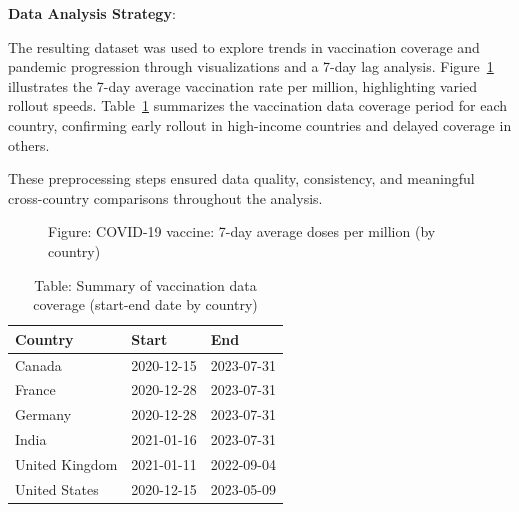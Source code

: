 \documentclass[
  11pt,
]{article}
\begin{document}
\textbf{Data Analysis Strategy}:

The resulting dataset was used to explore trends in vaccination coverage
and pandemic progression through visualizations and a 7-day lag
analysis. Figure~\ref{fig-vacc-trend} illustrates the 7-day average
vaccination rate per million, highlighting varied rollout speeds.
Table~\ref{tbl-vacc-summary} summarizes the vaccination data coverage
period for each country, confirming early rollout in high-income
countries and delayed coverage in others.

These preprocessing steps ensured data quality, consistency, and
meaningful cross-country comparisons throughout the analysis.

\begin{figure}


\caption{\label{fig-vacc-trend}Figure: COVID-19 vaccine: 7-day average
doses per million (by country)}

\end{figure}%

\begin{longtable}[]{@{}lll@{}}

\caption{\label{tbl-vacc-summary}Table: Summary of vaccination data
coverage (start-end date by country)}

\tabularnewline

\toprule\noalign{}
Country & Start & End \\
\midrule\noalign{}
\endhead
\bottomrule\noalign{}
\endlastfoot
Canada & 2020-12-15 & 2023-07-31 \\
France & 2020-12-28 & 2023-07-31 \\
Germany & 2020-12-28 & 2023-07-31 \\
India & 2021-01-16 & 2023-07-31 \\
United Kingdom & 2021-01-11 & 2022-09-04 \\
United States & 2020-12-15 & 2023-05-09 \\

\end{longtable}
\end{document}
